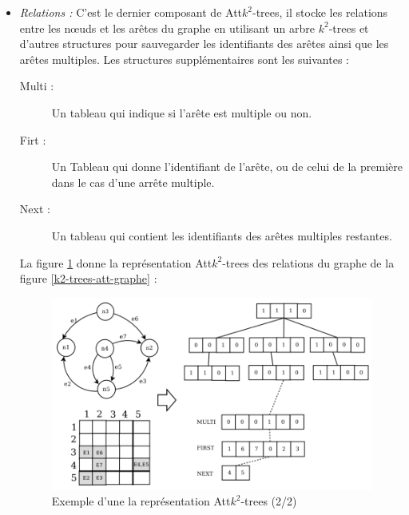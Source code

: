 \begin{itemize}
\item \textit{Relations :} C'est le dernier composant de Att$k^2$-trees, il stocke les relations entre les nœuds et les arêtes du graphe en utilisant un arbre $k^2$-trees et d'autres structures pour sauvegarder les identifiants des arêtes ainsi que les arêtes multiples. Les structures supplémentaires sont les suivantes :
\begin{description}
\item[Multi :] Un tableau qui indique si l'arête est multiple ou non.
\item[Firt :] Un Tableau qui donne l'identifiant de l'arête, ou de celui de la première dans le cas d'une arrête multiple.
\item[Next :] Un tableau qui contient les identifiants des arêtes multiples restantes.
\end{description}
La figure \ref{k2-trees-att-relation} donne la représentation Att$k^2$-trees des relations du graphe de la figure \ref{k2-trees-att-graphe} \citep{alvarez2018compact}:
\begin{figure}[H]
\begin{center}
\includegraphics[height=200 pt, width=280 pt]{./ressources/image/k2-trees-att-relation.png} 
\end{center}
\caption{Exemple d'une la représentation Att$k^2$-trees (2/2)}
\label{k2-trees-att-relation}
\end{figure} 
\end{itemize}

